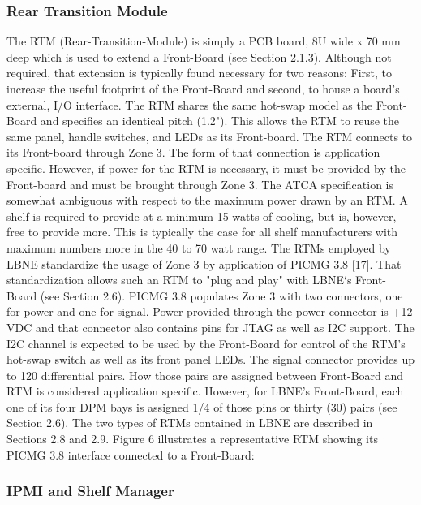 \subsubsection{Rear Transition Module}
\label{sec:rtm}
The RTM (Rear-Transition-Module) is simply a PCB board, 8U wide x 70 mm deep which is used to extend a Front-Board (see Section 2.1.3). Although not required, that extension is typically found necessary for two reasons: First, to increase the useful footprint of the Front-Board and second, to house a board's external, I/O interface. The RTM shares the same hot-swap model as the Front-Board and specifies an identical pitch (1.2"). This allows the RTM to reuse the same panel, handle switches, and LEDs as its Front-board. The RTM connects to its Front-board through Zone 3. The form of that connection is application specific. However, if power for the RTM is necessary, it must be provided by the Front-board and must be brought through Zone 3. The ATCA specification is somewhat ambiguous with respect to the maximum power drawn by an RTM. A shelf is required to provide at a minimum 15 watts of cooling, but is, however, free to provide more. This is typically the case for all shelf manufacturers with maximum numbers more in the 40 to 70 watt range.
The RTMs employed by LBNE standardize the usage of Zone 3 by application of PICMG 3.8 [17]. That standardization allows such an RTM to "plug and play" with LBNE‘s Front-Board (see Section 2.6). PICMG 3.8 populates Zone 3 with two connectors, one for power and one for signal. Power provided through the power connector is +12 VDC and that connector also contains pins for JTAG as well as I2C support. The I2C channel is expected to be used by the Front-Board for control of the RTM's hot-swap switch as well as its front panel LEDs.
The signal connector provides up to 120 differential pairs. How those pairs are assigned between Front-Board and RTM is considered application specific. However, for LBNE's Front-Board, each one of its four DPM bays is assigned 1/4 of those pins or thirty (30) pairs (see Section 2.6).
The two types of RTMs contained in LBNE are described in Sections 2.8 and 2.9. Figure 6 illustrates a representative RTM showing its PICMG 3.8 interface connected to a Front-Board:

\subsubsection{IPMI and Shelf Manager}


